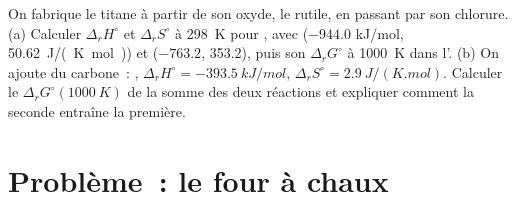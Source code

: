 \begin{exercise}[$\star\star\star$]\label{exo:b2:reaction-free-energy:12}
On fabrique le titane à partir de son oxyde, le rutile, en passant par son chlorure. (a) Calculer
$\Delta_r H^\circ$ et $\Delta_r S^\circ$ à \qty{298}{K} pour , avec  ($-944.0$ \unit{kJ/mol},
\qty{50.62}{J/(K.mol)}) et  ($-763.2$, 353.2), puis son
$\Delta_r G^\circ$ à \qty{1000}{K} dans l'.
(b) On ajoute du carbone~: , $\Delta_r H^\circ =
\qty{-393.5}{kJ/mol}$, $\Delta_r S^\circ = \qty{+2.9}{J/(K.mol)}$. Calculer
le $\Delta_r G^\circ(\qty{1000}{K})$ de la somme des deux réactions et
expliquer comment la seconde entraîne la première.
\end{exercise}

\section{Problème~: le four à chaux}

